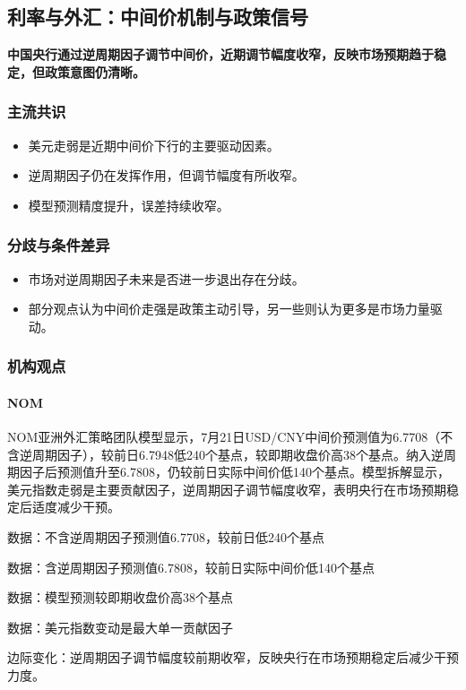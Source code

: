 \documentclass[11pt]{ctexart}
\begin{document}
\subsection{利率与外汇：中间价机制与政策信号}
\textbf{中国央行通过逆周期因子调节中间价，近期调节幅度收窄，反映市场预期趋于稳定，但政策意图仍清晰。}
\subsubsection*{主流共识}
\begin{itemize}
  \item 美元走弱是近期中间价下行的主要驱动因素。
  \item 逆周期因子仍在发挥作用，但调节幅度有所收窄。
  \item 模型预测精度提升，误差持续收窄。
\end{itemize}
\subsubsection*{分歧与条件差异}
\begin{itemize}
  \item 市场对逆周期因子未来是否进一步退出存在分歧。
  \item 部分观点认为中间价走强是政策主动引导，另一些则认为更多是市场力量驱动。
\end{itemize}
\subsubsection*{机构观点}
\paragraph{NOM} NOM亚洲外汇策略团队模型显示，7月21日USD/CNY中间价预测值为6.7708（不含逆周期因子），较前日6.7948低240个基点，较即期收盘价高38个基点。纳入逆周期因子后预测值升至6.7808，仍较前日实际中间价低140个基点。模型拆解显示，美元指数走弱是主要贡献因子，逆周期因子调节幅度收窄，表明央行在市场预期稳定后适度减少干预。
{\small\color{refgray}数据：不含逆周期因子预测值6.7708，较前日低240个基点\par}
{\small\color{refgray}数据：含逆周期因子预测值6.7808，较前日实际中间价低140个基点\par}
{\small\color{refgray}数据：模型预测较即期收盘价高38个基点\par}
{\small\color{refgray}数据：美元指数变动是最大单一贡献因子\par}
{\small\color{refgray}边际变化：逆周期因子调节幅度较前期收窄，反映央行在市场预期稳定后减少干预力度。\par}
\end{document}
